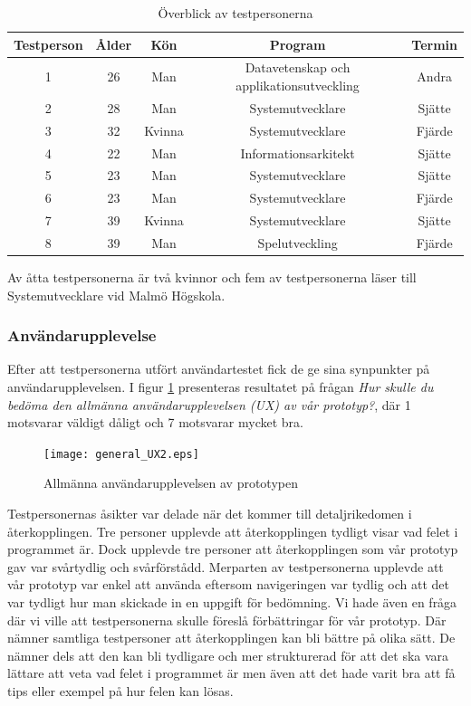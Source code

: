 \documentclass[a4paper,11pt]{article}
\begin{document}
{\begin{table}[h!]
	\centering
	\caption{Överblick av testpersonerna}
	\label{tab:Testpersoner}
	\begin{tabular}{c c c c c}
		\toprule
		Testperson & Ålder & Kön & Program & Termin\\
		\midrule
		1 & 26 & Man & Datavetenskap och applikationsutveckling & Andra\\
		2 & 28 & Man & Systemutvecklare & Sjätte\\
		3 & 32 & Kvinna & Systemutvecklare & Fjärde\\
		4 & 22 & Man & Informationsarkitekt & Sjätte\\
		5 & 23 & Man & Systemutvecklare & Sjätte\\
		6 & 23 & Man & Systemutvecklare & Fjärde\\
		7 & 39 & Kvinna & Systemutvecklare & Sjätte\\
		8 & 39 & Man & Spelutveckling & Fjärde\\
		\bottomrule
	\end{tabular}
\end{table}
Av åtta testpersonerna är två kvinnor och fem av testpersonerna läser till Systemutvecklare vid Malmö Högskola.

\subsubsection{Användarupplevelse}\label{Användarupplevelse}
Efter att testpersonerna utfört användartestet fick de ge sina synpunkter på användarupplevelsen. I figur \ref{fig:GeneralUX2} presenteras resultatet på frågan \textit{Hur skulle du bedöma den allmänna användarupplevelsen (UX) av vår prototyp?}, där 1 motsvarar väldigt dåligt och 7 motsvarar mycket bra.

\begin{figure}[ht!]
\centering
\texttt{[image: general\_UX2.eps]}
\caption{Allmänna användarupplevelsen av prototypen}
\label{fig:GeneralUX2}
\end{figure}

Testpersonernas åsikter var delade när det kommer till detaljrikedomen i återkopplingen. Tre personer upplevde att återkopplingen tydligt visar vad felet i programmet är. Dock upplevde tre personer att återkopplingen som vår prototyp gav var svårtydlig och svårförstådd. Merparten av testpersonerna upplevde att vår prototyp var enkel att använda eftersom navigeringen var tydlig och att det var tydligt hur man skickade in en uppgift för bedömning. 
Vi hade även en fråga där vi ville att testpersonerna skulle föreslå förbättringar för vår prototyp. Där nämner samtliga testpersoner att återkopplingen kan bli bättre på olika sätt. De nämner dels att den kan bli tydligare och mer strukturerad för att det ska vara lättare att veta vad felet i programmet är men även att det hade varit bra att få tips eller exempel på hur felen kan lösas. 

}
\end{document}
